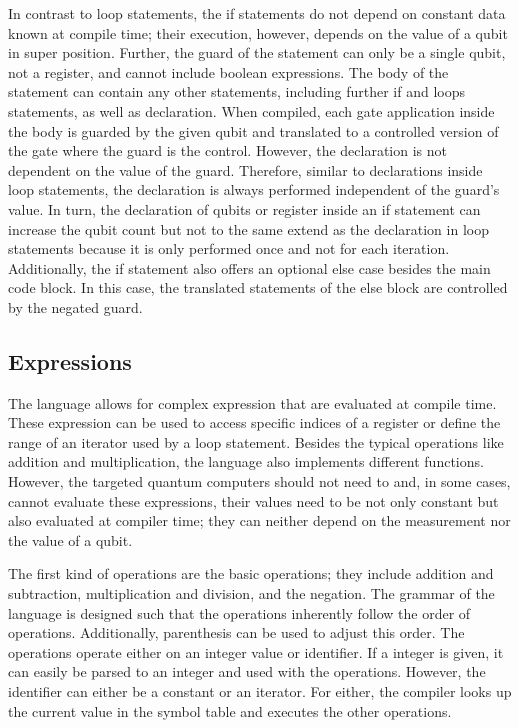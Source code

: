 In contrast to loop statements, the if statements do not depend on constant data known at compile time; their execution, however, depends on the value of a qubit in super position. Further, the guard of the statement can only be a single qubit, not a register, and cannot include boolean expressions.
The body of the statement can contain any other statements, including further if and loops statements, as well as declaration. When compiled, each gate application inside the body is guarded by the given qubit and translated to a controlled version of the gate where the guard is the control. However, the declaration is not dependent on the value of the guard. Therefore, similar to declarations inside loop statements, the declaration is always performed independent of the guard's value. In turn, the declaration of qubits or register inside an if statement can increase the qubit count but not to the same extend as the declaration in loop statements because it is only performed once and not for each iteration. Additionally, the if statement also offers an optional else case besides the main code block. In this case, the translated statements of the else block are controlled by the negated guard. 

\subsection{Expressions}
\label{sec:concept_expressions}
The language allows for complex expression that are evaluated at compile time. These expression can be used to access specific indices of a register or define the range of an iterator used by a loop statement. Besides the typical operations like addition and multiplication, the language also implements different functions. However, the targeted quantum computers should not need to and, in some cases, cannot evaluate these expressions, their values need to be not only constant but also evaluated at compiler time; they can neither depend on the measurement nor the value of a qubit.  

The first kind of operations are the basic operations; they include addition and subtraction, multiplication and division, and the negation. The grammar of the language is designed such that the operations inherently follow the order of operations. Additionally, parenthesis can be used to adjust this order. The operations operate either on an integer value or identifier. If a integer is given, it can easily be parsed to an integer and used with the operations. However, the identifier can either be a constant or an iterator. For either, the compiler looks up the current value in the symbol table and executes the other operations. 


